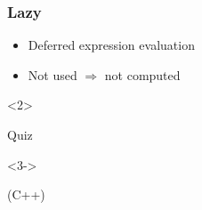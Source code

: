 \documentclass[17pt]{beamer}
\renewcommand{\(}[1]{\begin{columns}[#1]}
\renewcommand{\)}{\end{columns}}
\newcommand{\<}[1]{\begin{column}{#1}}
\renewcommand{\>}{\end{column}}
\begin{document}
\begin{frame}
  \frametitle{Lazy}
  \begin{minipage}[t][.3\textheight]{\textwidth}
  \begin{itemize}
  \item Deferred expression evaluation
  \item Not used $\Rightarrow$ not computed
  \end{itemize}
  \end{minipage}

  \begin{minipage}[c][.5\textheight]{\textwidth}
  \begin{onlyenv}<2>
    \begin{center}
      Quiz
    \end{center}
  \end{onlyenv}

  \begin{onlyenv}<3->
    \begin{center}
      (C++)\par
      \Large
    \end{center}
  \end{onlyenv}
  \end{minipage}
\end{frame}
\end{document}
